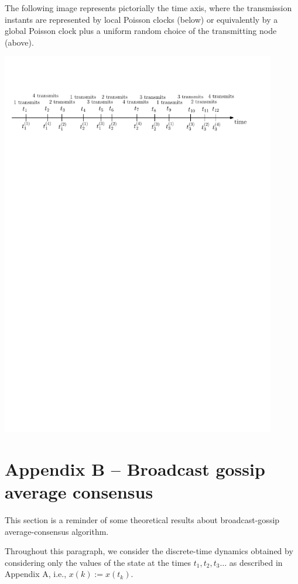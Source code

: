 \documentclass{article}
\begin{document}
The following image represents pictorially
the time axis, where the transmission instants are represented by local Poisson clocks (below) or equivalently by a global Poisson clock plus a uniform random choice of the transmitting node (above).
\begin{center}
\includegraphics[width=0.9\textwidth]{timeline}
\end{center}






\section*{Appendix B -- Broadcast gossip average consensus}

This section is a reminder of some theoretical results about broadcast-gossip average-consensus algorithm.

Throughout this paragraph, we consider the discrete-time dynamics obtained by considering only the values of the state at the times $t_1, t_2, t_3 \dots$ as described in Appendix A, i.e., $x(k) := x(t_k)$. \\
\end{document}
